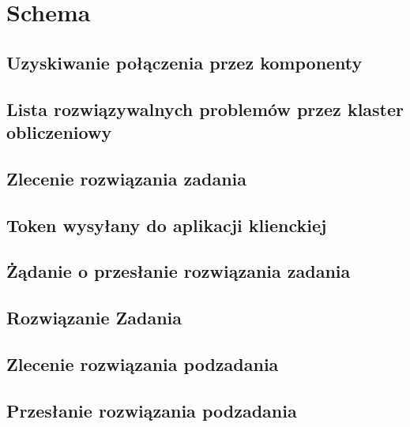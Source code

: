 \documentclass[12pt,a4paper,titlepage]{report}
\begin{document}
	
	\section{Schema}
		\subsection{Uzyskiwanie połączenia przez komponenty}	
			
		\subsection{Lista rozwiązywalnych problemów przez klaster obliczeniowy}
			
		\subsection{Zlecenie rozwiązania zadania}
			
		\subsection{Token wysyłany do aplikacji klienckiej}
			
		\subsection{Żądanie o przesłanie rozwiązania zadania}
			
		\subsection{Rozwiązanie Zadania}
			
		\subsection{Zlecenie rozwiązania podzadania}
			
		\subsection{Przesłanie rozwiązania podzadania}
			
\end{document}
